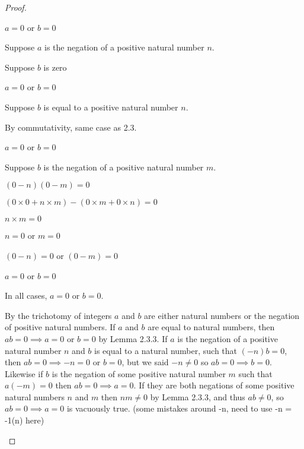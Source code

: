 \documentclass[../../main.tex]{subfiles}
\begin{document}
\begin{proof}
\begin{linebyline}
\begin{linebyline}
            \item $a = 0$ or $b = 0$  
        \end{linebyline}
        \item Suppose $a$ is the negation of a positive natural number $n$.
        \begin{linebyline}
            \item Suppose $b$ is zero
            \begin{linebyline}
                \item $a = 0$ or $b = 0$
            \end{linebyline}
            \item Suppose $b$ is equal to a positive natural number $n$.
            \begin{linebyline}
                \item By commutativity, same case as 2.3. 
                \item $a = 0$ or $b = 0$
            \end{linebyline}
            \item Suppose $b$ is the negation of a positive natural number $m$.
            \begin{linebyline}
                \item $(0-n)(0-m)=0$
                \item $(0 \times 0 + n \times m)-(0 \times m + 0 \times n) = 0$
                \item $n \times m = 0$
                \item $n = 0$ or $m = 0$
                \item $(0 - n) = 0$ or $(0 - m) = 0$
                \item $a = 0$ or $b = 0$
            \end{linebyline}
        \end{linebyline}
    \end{linebyline}
    In all cases, $a = 0$ or $b = 0$.
    
\begin{xx}
        By the trichotomy of integers $a$ and $b$ are either natural numbers or the negation of positive natural numbers. If $a$ and $b$ are equal to natural numbers, then $ab=0 \implies a=0$ or $b=0$ by Lemma 2.3.3. If $a$ is the negation of a positive natural number $n$ and $b$ is equal to a natural number, such that $(-n)b=0$, then $ab=0 \implies -n=0$ or $b=0$, but we said $-n \neq 0$ so $ab=0 \implies b=0$. Likewise if $b$ is the negation of some positive natural number $m$ such that $a(-m)=0$ then $ab=0 \implies a=0$. If they are both negations of some positive natural numbers $n$ and $m$ then $nm \neq 0$ by Lemma 2.3.3, and thus $ab \neq 0$, so $ab=0 \implies a=0$ is vacuously true. (some mistakes around -n, need to use -n = -1(n) here)
\end{xx}    
\end{proof}
\end{document}
